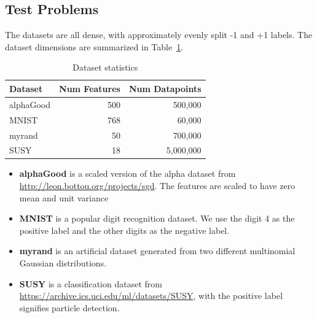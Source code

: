 \documentclass[11pt]{article}
\begin{document}
   \subsection{Test Problems}

The datasets are all dense, with approximately evenly split -1 and +1 labels. The dataset dimensions are summarized in Table~\ref{table:sizes}.

\begin{table}[htb!]	%
	\centering
	\begin{tabular}{lrr}
		\toprule
		\textbf{Dataset} & \textbf{Num Features} & \textbf{Num Datapoints}\\
		\midrule
		             alphaGood &              500 &              500,000\\
		             MNIST &              768 &              60,000\\
		             myrand &              50 &              700,000\\
		             SUSY &              18 &              5,000,000\\
		\bottomrule
	\end{tabular}
	\caption{Dataset statistics}
	\label{table:sizes}
\end{table}

\begin{itemize}
	\item \textbf{alphaGood} is a scaled version of the alpha dataset from \url{http://leon.bottou.org/projects/sgd}. The features are scaled to have zero mean and unit variance
	\item \textbf{MNIST} is a popular digit recognition dataset. We use the digit 4 as the positive label and the other digits as the negative label. 
	\item \textbf{myrand} is an artificial dataset generated from two different multinomial Gaussian distributions. 
	\item  \textbf{SUSY} is a classification dataset from \url{https://archive.ics.uci.edu/ml/datasets/SUSY}, with the positive label signifies particle detection. 
\end{itemize}



\end{document}
